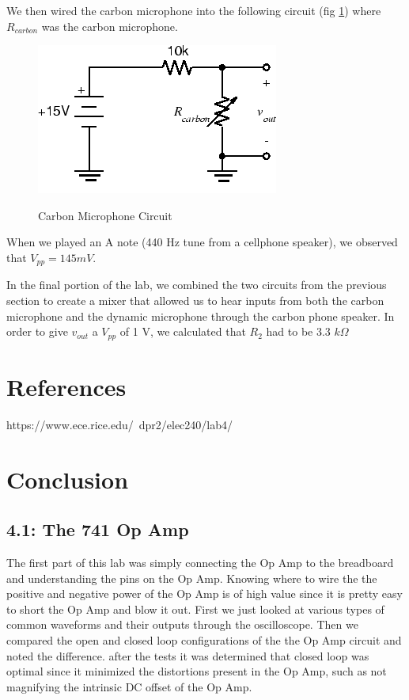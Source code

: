 \documentclass[10pt]{article}
\begin{document}
We then wired the carbon microphone into the following circuit (fig \ref{fig:carbon}) where $R_{carbon}$ was the carbon microphone. 

\begin{centering}
	\begin{figure} [H]
		\centering
		\includegraphics[scale=0.50]{images/carbonmicrophone.png}\
		\caption{Carbon Microphone Circuit}
		\label{fig:carbon}
	\end{figure}
\end{centering}

When we played an A note (440 Hz tune from a cellphone speaker), we observed that $V_{pp} = 145mV$.  

In the final portion of the lab, we combined the two circuits from the previous section to create a mixer that allowed us to hear inputs from both the carbon microphone and the dynamic microphone through the carbon phone speaker. In order to give $v_{out}$ a $V_{pp}$ of 1 V, we calculated that $R_2$ had to be 3.3 $k\Omega$

\section{References}

https://www.ece.rice.edu/~dpr2/elec240/lab4/

\section{Conclusion}

\subsection{4.1: The 741 Op Amp}
The first part of this lab was simply connecting the Op Amp to the breadboard and understanding the pins on the Op Amp. Knowing where to wire the the positive and negative power of the Op Amp is of high value since it is pretty easy to short the Op Amp and blow it out. First we just looked at various types of common waveforms and their outputs through the oscilloscope. Then we compared the open and closed loop configurations of the the Op Amp circuit and noted the difference. after the tests it was determined that closed loop was optimal since it minimized the distortions present in the Op Amp, such as not magnifying the intrinsic DC offset of the Op Amp.
\end{document}
